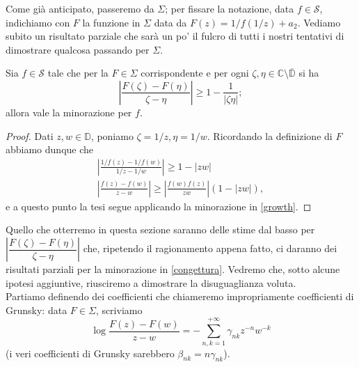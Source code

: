 Come già anticipato, passeremo da $\Sigma$; per fissare la notazione, data $f \in \mathcal{S}$, indichiamo con $F$ la funzione in $\Sigma$ data da $F(z)=1/f(1/z)+a_2$. Vediamo subito un risultato parziale che sarà un po' il fulcro di tutti i nostri tentativi di dimostrare qualcosa passando per $\Sigma$.

\begin{prop}
  Sia $f \in \mathcal{S}$ tale che per la $F \in \Sigma$ corrispondente e per ogni $\zeta,\eta \in \mathbb{C}\setminus\overline{\mathbb{D}}$ si ha
  $$\left|\frac{F(\zeta)-F(\eta)}{\zeta-\eta}\right| \ge 1-\frac{1}{|\zeta\eta|};$$
  allora vale la minorazione per $f$.
\end{prop}

\begin{proof}
  Dati $z,w \in \mathbb{D}$, poniamo $\zeta=1/z, \eta=1/w$. Ricordando la definizione di $F$ abbiamo dunque che
  \begin{gather*}
    \left|\frac{1/f(z)-1/f(w)}{1/z-1/w}\right| \ge 1-|zw| \\
    \left|\frac{f(z)-f(w)}{z-w}\right| \ge \left|\frac{f(w)f(z)}{zw}\right| (1-|zw|),
  \end{gather*}
  e a questo punto la tesi segue applicando la minorazione in \eqref{growth}.
\end{proof}

Quello che otterremo in questa sezione saranno delle stime dal basso per $\left|\dfrac{F(\zeta)-F(\eta)}{\zeta-\eta}\right|$ che, ripetendo il ragionamento appena fatto, ci daranno dei risultati parziali per la minorazione in \eqref{congettura}. Vedremo che, sotto alcune ipotesi aggiuntive, riusciremo a dimostrare la disuguaglianza voluta. \\

Partiamo definendo dei coefficienti che chiameremo impropriamente coefficienti di Grunsky: data $F \in \Sigma$, scriviamo
$$\log{\frac{F(z)-F(w)}{z-w}}=-\sum_{n,k=1}^{+\infty} \gamma_{nk}z^{-n}w^{-k}$$
(i veri coefficienti di Grunsky sarebbero $\beta_{nk}=n\gamma_{nk}$).

